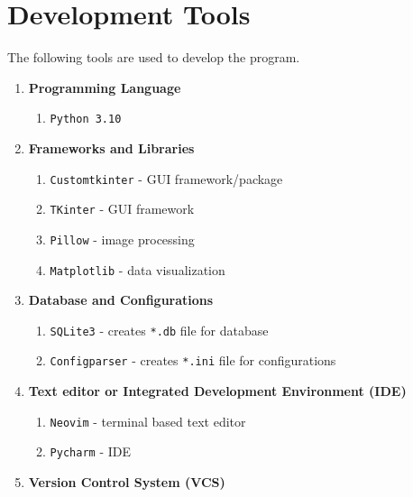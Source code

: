 \documentclass[12pt,a4paper]{article}
\renewcommand{\indent}{\hspace\parindent}
\begin{document}
    \section*{Development Tools}

        \indent The following tools are used to develop the program.

        \begin{enumerate}
            \item[\faCode]  \textbf{Programming Language} 
                \begin{enumerate}
                    \item[] \texttt{Python 3.10}
                \end{enumerate}
            \item[\faGears]  \textbf{Frameworks and Libraries} 
                \begin{enumerate}
                    \item[] \texttt{Customtkinter} - GUI framework/package
                    \item[] \texttt{TKinter} - GUI framework
                    \item[] \texttt{Pillow} - image processing
                    \item[] \texttt{Matplotlib} - data visualization
                \end{enumerate}
            \item[\faDatabase]  \textbf{Database and Configurations} 
                \begin{enumerate}
                    \item[] \texttt{SQLite3} - creates \texttt{*.db} file for database
                    \item[] \texttt{Configparser} - creates \texttt{*.ini} file for configurations
                \end{enumerate}
            \item[\faEdit]  \textbf{Text editor or Integrated Development Environment (IDE)} 
                \begin{enumerate}
                    \item[] \texttt{Neovim} - terminal based text editor
                    \item[] \texttt{Pycharm} - IDE
                \end{enumerate}
            \item[\faGithub]  \textbf{Version Control System (VCS)} 
                \begin{enumerate}

\end{enumerate}
\end{enumerate}
\end{document}
